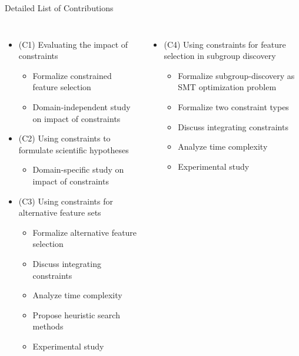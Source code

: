 \documentclass[en, navbarinline, handout]{sdqbeamer}
\begin{document}
\begin{frame}[t]{Detailed List of Contributions}
	\begin{columns}
		\begin{itemize}
			\item (C1) Evaluating the impact of constraints \cite{bach2022empirical}
			\begin{itemize}
				\item Formalize constrained feature selection
				\item Domain-independent study on impact of constraints
			\end{itemize}
			\item (C2) Using constraints to formulate scientific hypotheses \cite{bach2022empirical}
			\begin{itemize}
				\item Domain-specific study on impact of constraints
			\end{itemize}
			\item (C3) Using constraints for alternative feature sets \cite{bach2023finding, bach2024alternative}
			\begin{itemize}
				\item Formalize alternative feature selection
				\item Discuss integrating constraints
				\item Analyze time complexity
				\item Propose heuristic search methods
				\item Experimental study
			\end{itemize}
		\end{itemize}
		\begin{itemize}
			\item (C4) Using constraints for feature selection in subgroup discovery \cite{bach2025subgroup, bach2024using}
			\begin{itemize}
				\item Formalize subgroup-discovery as SMT optimization problem
				\item Formalize two constraint types
				\item Discuss integrating constraints
				\item Analyze time complexity
				\item Experimental study
			\end{itemize}
		\end{itemize}
	\end{columns}
\end{frame}
\end{document}
